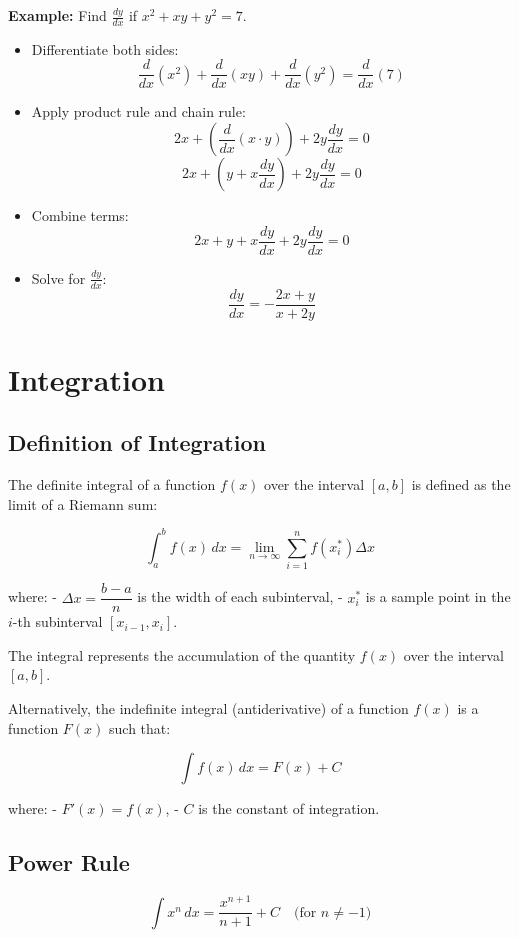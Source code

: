 \documentclass{article}
\begin{document}
\begin{multicols}{2}
\textbf{Example:}
Find \(\frac{dy}{dx}\) if \(x^2 + xy + y^2 = 7\).
\begin{itemize}
    \item Differentiate both sides:
    \[
    \frac{d}{dx}(x^2) + \frac{d}{dx}(xy) + \frac{d}{dx}(y^2) = \frac{d}{dx}(7)
    \]
    \item Apply product rule and chain rule:
    \[
    2x + \left(\frac{d}{dx}(x \cdot y)\right) + 2y \frac{dy}{dx} = 0
    \]
    \[
    2x + \left(y + x \frac{dy}{dx}\right) + 2y \frac{dy}{dx} = 0
    \]
    \item Combine terms:
    \[
    2x + y + x \frac{dy}{dx} + 2y \frac{dy}{dx} = 0
    \]
    \item Solve for \(\frac{dy}{dx}\):
    \[
    \frac{dy}{dx} = -\frac{2x + y}{x + 2y}
    \]
\end{itemize}

\columnbreak

\section*{Integration}
\subsection*{Definition of Integration}

The definite integral of a function \( f(x) \) over the interval \([a, b]\) is defined as the limit of a Riemann sum:

\[
\int_{a}^{b} f(x) \, dx = \lim_{n \to \infty} \sum_{i=1}^{n} f(x_i^*) \Delta x
\]

where:
- \( \Delta x = \dfrac{b - a}{n} \) is the width of each subinterval,
- \( x_i^* \) is a sample point in the \( i \)-th subinterval \([x_{i-1}, x_i]\).

The integral represents the accumulation of the quantity \( f(x) \) over the interval \([a, b]\).

Alternatively, the indefinite integral (antiderivative) of a function \( f(x) \) is a function \( F(x) \) such that:

\[
\int f(x) \, dx = F(x) + C
\]

where:
- \( F'(x) = f(x) \),
- \( C \) is the constant of integration.

\subsection*{Power Rule}
\[
\int x^n \, dx = \frac{x^{n+1}}{n+1} + C \quad \text{(for } n \neq -1\text{)}
\]


\end{multicols}
\end{document}

